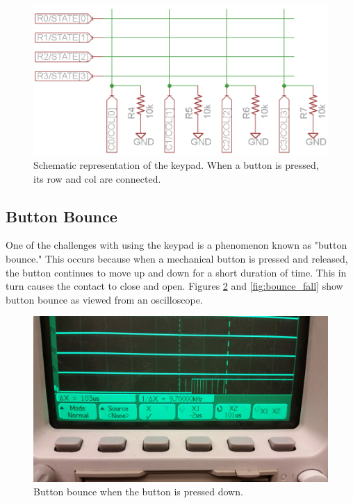 \documentclass[11pt]{article}
\begin{document}
\begin{figure}[h!]
\centering
\includegraphics[scale=0.4]{keypad_sch.png}
\caption{Schematic representation of the keypad. When a button is pressed, its row and col are connected.}
\label{fig:keypad_sch}
\end{figure} 


\subsection{Button Bounce}
\label{sec:button_bounce}

One of the challenges with using the keypad is a phenomenon known as "button bounce." This occurs because when a mechanical button is pressed and released, the button continues to move up and down for a short duration of time. This in turn causes the contact to close and open. Figures \ref{fig:bounce_rise} and \ref{fig:bounce_fall} show button bounce as viewed from an oscilloscope. \\


\begin{figure}[h!]
\centering
\includegraphics[scale=0.11]{bounce_rise.jpg}
\caption{Button bounce when the button is pressed down.}
\label{fig:bounce_rise}
\end{figure} 
\end{document}

